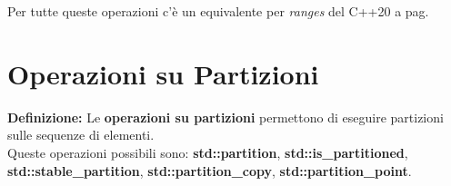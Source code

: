\fleuron

\textsf{\small Per tutte queste operazioni c'è un equivalente per \emph{ranges} del C++20 a pag. \pageref{ranges_seq_modificabili}} \\


\section{Operazioni su Partizioni}

\textsf{\small \textbf{Definizione: } Le \textbf{operazioni su partizioni} permettono di eseguire partizioni sulle sequenze di elementi.} \\

\textsf{\small Queste operazioni possibili sono: \textbf{std::partition}, \textbf{std::is\_partitioned}, \textbf{std::stable\_partition}, \textbf{std::partition\_copy}, \textbf{std::partition\_point}.} \\

